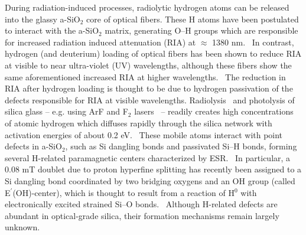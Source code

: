 \documentclass[aps,prb,reprint,superscriptaddress,showpacs]{revtex4-1}
\begin{document}
During radiation-induced processes, radiolytic hydrogen atoms can be released into the glassy a-SiO$_2$ core of optical fibers. These H atoms have been postulated to interact with the a-SiO$_2$ matrix, generating \mbox{O--H} groups which are responsible for increased radiation induced attenuation (RIA) at $\approx$ 1380 nm.~\cite{girard_sio2_review} In contrast, hydrogen (and deuterium) loading of optical fibers has been shown to reduce RIA at visible to near ultra-violet (UV) wavelengths, although these fibers show the same aforementioned increased RIA at higher wavelengths.~\cite{hydrogen_ria} The reduction in RIA after hydrogen loading is thought to be due to hydrogen passivation of the defects responsible for RIA at visible wavelengths. Radiolysis~\cite{shkrob1,shkrob2} and photolysis of silica glass -- e.g. using ArF and F$_2$ lasers~\cite{skuja_hydrogen,skuja_hydrogen2,skuja_hdiffusion} -- readily creates high concentrations of atomic hydrogen which diffuses rapidly through the silica network with activation energies of about 0.2 eV.~\cite{kajihara_hydrogen,skuja_hdiffusion} These mobile atoms interact with point defects in a-SiO$_2$, such as Si dangling bonds and passivated \mbox{Si--H} bonds, forming several H-related paramagnetic centers characterized by ESR.~\cite{vitko_hydrogen,radzig_surface,skuja_hydrogen,skuja_hydrogen2} In particular, a 0.08 mT doublet due to proton hyperfine splitting has recently been assigned to a Si dangling bond coordinated by two bridging oxygens and an OH group (called E$^\prime$(OH)-center), which is thought to result from a reaction of H$^0$ with electronically excited strained \mbox{Si--O} bonds.~\cite{skuja_hydrogen} Although H-related defects are abundant in optical-grade silica, their formation mechanisms remain largely unknown. 
\end{document}
